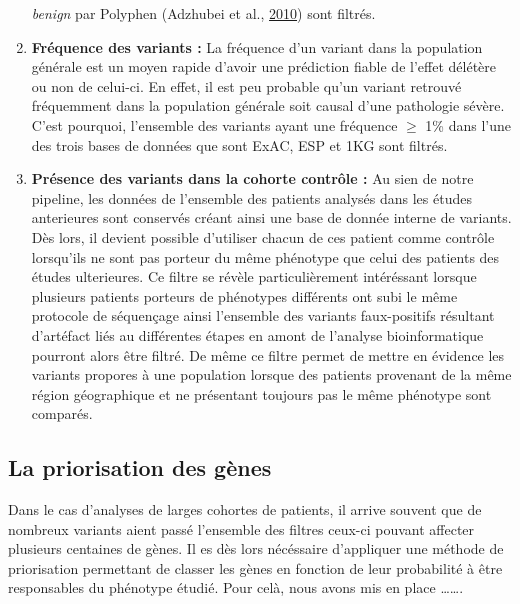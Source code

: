 \documentclass[12pt,twoside]{reedthesis}
\theoremstyle{definition}
\theoremstyle{definition}
\theoremstyle{remark}
\begin{document}
\begin{enumerate}
    \emph{benign} par Polyphen (Adzhubei et al.,
    \protect\hyperlink{ref-Adzhubei2010}{2010}) sont filtrés.
  \item
    \textbf{Fréquence des variants :} La fréquence d'un variant dans la
    population générale est un moyen rapide d'avoir une prédiction fiable
    de l'effet délétère ou non de celui-ci. En effet, il est peu probable
    qu'un variant retrouvé fréquemment dans la population générale soit
    causal d'une pathologie sévère. C'est pourquoi, l'ensemble des
    variants ayant une fréquence \(\ge\) 1\% dans l'une des trois bases de
    données que sont ExAC, ESP et 1KG sont filtrés.
  \item
    \textbf{Présence des variants dans la cohorte contrôle :} Au sien de
    notre pipeline, les données de l'ensemble des patients analysés dans
    les études anterieures sont conservés créant ainsi une base de donnée
    interne de variants. Dès lors, il devient possible d'utiliser chacun
    de ces patient comme contrôle lorsqu'ils ne sont pas porteur du même
    phénotype que celui des patients des études ulterieures. Ce filtre se
    révèle particulièrement intéréssant lorsque plusieurs patients
    porteurs de phénotypes différents ont subi le même protocole de
    séquençage ainsi l'ensemble des variants faux-positifs résultant
    d'artéfact liés au différentes étapes en amont de l'analyse
    bioinformatique pourront alors être filtré. De même ce filtre permet
    de mettre en évidence les variants propores à une population lorsque
    des patients provenant de la même région géographique et ne présentant
    toujours pas le même phénotype sont comparés.
  \end{enumerate}
  
  \newpage
  
  \subsection{La priorisation des gènes}\label{la-priorisation-des-genes}
  
  Dans le cas d'analyses de larges cohortes de patients, il arrive souvent
  que de nombreux variants aient passé l'ensemble des filtres ceux-ci
  pouvant affecter plusieurs centaines de gènes. Il es dès lors nécéssaire
  d'appliquer une méthode de priorisation permettant de classer les gènes
  en fonction de leur probabilité à être responsables du phénotype étudié.
  Pour celà, nous avons mis en place \ldots{}\ldots{}.
  
  \newpage
  
\end{document}
